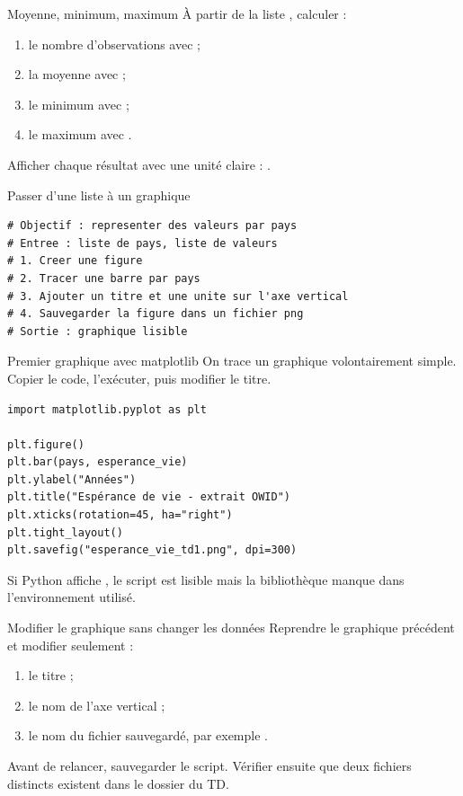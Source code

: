 \documentclass[11pt,a4paper]{article}
\begin{document}
\begin{mandatoryexercise}{Moyenne, minimum, maximum}
À partir de la liste , calculer :
\begin{enumerate}
  \item le nombre d'observations avec  ;
  \item la moyenne avec  ;
  \item le minimum avec  ;
  \item le maximum avec .
\end{enumerate}
Afficher chaque résultat avec une unité claire : .
\end{mandatoryexercise}

\begin{pseudocodeexercise}{Passer d'une liste à un graphique}
\begin{lstlisting}
# Objectif : representer des valeurs par pays
# Entree : liste de pays, liste de valeurs
# 1. Creer une figure
# 2. Tracer une barre par pays
# 3. Ajouter un titre et une unite sur l'axe vertical
# 4. Sauvegarder la figure dans un fichier png
# Sortie : graphique lisible
\end{lstlisting}
\end{pseudocodeexercise}

\begin{mandatoryexercise}{Premier graphique avec matplotlib}
On trace un graphique volontairement simple. Copier le code, l'exécuter, puis modifier le titre.
\begin{lstlisting}
import matplotlib.pyplot as plt

plt.figure()
plt.bar(pays, esperance_vie)
plt.ylabel("Années")
plt.title("Espérance de vie - extrait OWID")
plt.xticks(rotation=45, ha="right")
plt.tight_layout()
plt.savefig("esperance_vie_td1.png", dpi=300)
\end{lstlisting}
Si Python affiche , le script est lisible mais la bibliothèque manque dans l'environnement utilisé.
\end{mandatoryexercise}

\begin{mandatoryexercise}{Modifier le graphique sans changer les données}
Reprendre le graphique précédent et modifier seulement :
\begin{enumerate}
  \item le titre ;
  \item le nom de l'axe vertical ;
  \item le nom du fichier sauvegardé, par exemple .
\end{enumerate}
Avant de relancer, sauvegarder le script. Vérifier ensuite que deux fichiers  distincts existent dans le dossier du TD.
\end{mandatoryexercise}
\end{document}

